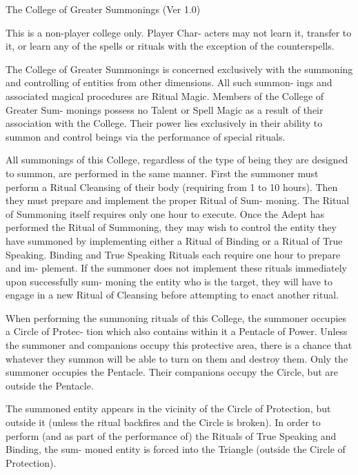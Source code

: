 \begin{Chapter}{The College of Greater Summonings (Ver 1.0)}

This  is  a  non-player  college  only.  Player  Char-
acters  may  not  learn  it,  transfer  to  it,  or  learn 
any of the spells or rituals with the exception of 
the counterspells. 

The  College  of  Greater  Summonings  is  concerned 
exclusively with the summoning and controlling of 
entities  from other  dimensions.  All  such  summon-
ings  and  associated  magical  procedures  are  Ritual 
Magic.  Members  of  the  College  of  Greater  Sum-
monings  possess  no  Talent  or  Spell  Magic  as  a 
result  of  their  association  with  the  College.  Their 
power  lies  exclusively  in  their  ability  to  summon 
and  control  beings  via  the  performance  of  special 
rituals. 

All  summonings  of  this  College,  regardless  of  the 
type  of  being  they  are  designed  to  summon,  are 
performed in the same manner. First the summoner 
must  perform  a  Ritual  Cleansing  of  their  body 
(requiring  from  1  to  10  hours).  Then  they  must 
prepare  and  implement  the  proper  Ritual  of  Sum-
moning.  The  Ritual  of  Summoning  itself  requires 
only  one  hour  to  execute.  Once  the  Adept  has 
performed  the  Ritual  of  Summoning,  they  may 
wish to control the entity they have  summoned by 
implementing either a Ritual of Binding or a Ritual 
of  True  Speaking.  Binding  and  True  Speaking 
Rituals  each  require  one  hour  to  prepare  and  im-
plement.  If  the  summoner  does  not  implement 
these  rituals  immediately  upon  successfully  sum-
moning the entity who is the target, they will have 
to  engage  in  a  new  Ritual  of  Cleansing  before 
attempting to enact another ritual. 

When  performing  the  summoning  rituals  of  this 
College, the summoner occupies a Circle of Protec-
tion  which  also  contains  within  it  a  Pentacle  of 
Power.  Unless  the  summoner  and  companions 
occupy  this  protective  area,  there  is  a  chance  that 
whatever they summon will be able to turn on them 
and destroy them. Only the summoner occupies the 
Pentacle. Their companions occupy the Circle, but 
are outside the Pentacle. 

The summoned entity appears in the vicinity of the 
Circle of Protection, but outside it (unless the ritual 
backfires  and  the  Circle  is  broken).  In  order  to 
perform  (and  as  part  of  the  performance  of)  the 
Rituals  of  True  Speaking  and  Binding,  the  sum-
moned  entity  is  forced  into  the  Triangle  (outside 
the Circle of Protection). 


\end{Chapter}
